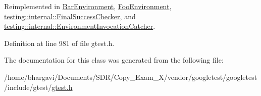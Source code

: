 Reimplemented in \hyperlink{class_bar_environment_a384f951da72a2a18bb0c2b3506376b09}{Bar\+Environment}, \hyperlink{class_foo_environment_a99a2c9df52106cce9e7a4bdda53df802}{Foo\+Environment}, \hyperlink{classtesting_1_1internal_1_1_final_success_checker_a8f39d12a1f2bfe8c6c04b5c6749382c9}{testing\+::internal\+::\+Final\+Success\+Checker}, and \hyperlink{classtesting_1_1internal_1_1_environment_invocation_catcher_afc89ee0a8e32e6746a89fcc1682f62e9}{testing\+::internal\+::\+Environment\+Invocation\+Catcher}.



Definition at line 981 of file gtest.\+h.



The documentation for this class was generated from the following file\+:\begin{DoxyCompactItemize}
\item 
/home/bhargavi/\+Documents/\+S\+D\+R/\+Copy\+\_\+\+Exam\+\_\+X/vendor/googletest/googletest/include/gtest/\hyperlink{gtest_8h}{gtest.\+h}\end{DoxyCompactItemize}
